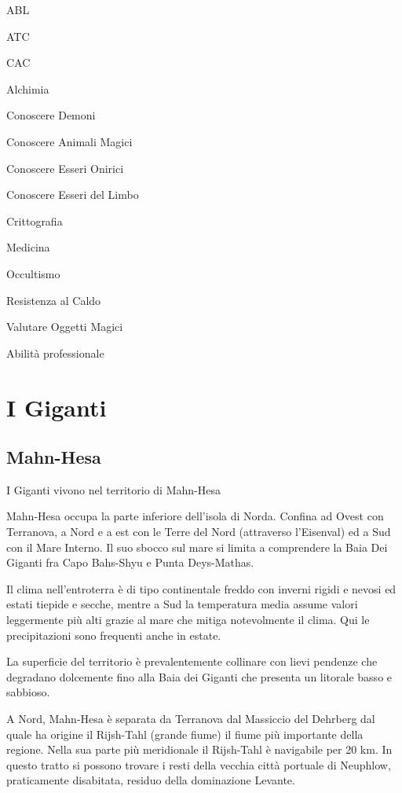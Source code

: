 \begin{abilist}
\item ABL
\item ATC
\item CAC
\item Alchimia
\item Conoscere Demoni
\item Conoscere Animali Magici
\item Conoscere Esseri Onirici
\item Conoscere Esseri del Limbo
\item Crittografia
\item Medicina
\item Occultismo
\item Resistenza al Caldo
\item Valutare Oggetti Magici
\item Abilit\`a professionale
\end{abilist}


\section{I Giganti}

\subsection{Mahn-Hesa}


I Giganti vivono nel territorio di Mahn-Hesa 

\Geografia Mahn-Hesa occupa la parte inferiore dell'isola di Norda.
Confina ad Ovest con Terranova, a Nord e a est con le Terre del Nord
(attraverso l'Eisenval) ed a Sud con il Mare Interno. Il suo sbocco
sul mare si limita a comprendere la Baia Dei Giganti fra Capo
Bahs-Shyu e Punta Deys-Mathas.

Il clima nell'entroterra \`e di tipo continentale freddo con inverni
rigidi e nevosi ed estati tiepide e secche, mentre a Sud la
temperatura media assume valori leggermente pi\`u alti grazie al mare
che mitiga notevolmente il clima. Qui le precipitazioni sono frequenti
anche in estate.

La superficie del territorio \`e prevalentemente collinare con lievi
pendenze che degradano dolcemente fino alla Baia dei Giganti che
presenta un litorale basso e sabbioso.

A Nord, Mahn-Hesa \`e separata da Terranova dal Massiccio del Dehrberg
dal quale ha origine il Rijsh-Tahl (grande fiume) il fiume pi\`u
importante della regione.  Nella sua parte pi\`u meridionale il
Rijsh-Tahl \`e navigabile per 20 km. In questo tratto si possono
trovare i resti della vecchia citt\`a portuale di Neuphlow,
praticamente disabitata, residuo della dominazione Levante.

